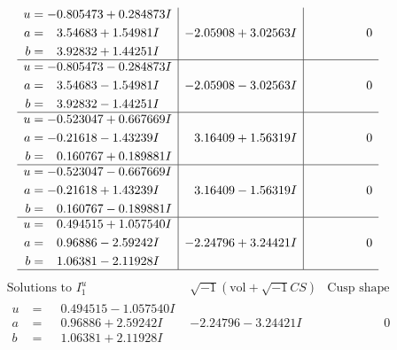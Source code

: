 \documentclass[1p]{elsarticle_modified}
\theoremstyle{definition}
\newcommand{\I}{\sqrt{-1}}
\begin{document}
$$\begin{array}{c|c|c}
\begin{aligned}
u &= -0.805473 + 0.284873 I \\
a &= \phantom{-}3.54683 + 1.54981 I \\
b &= \phantom{-}3.92832 + 1.44251 I\end{aligned}
 & -2.05908 + 3.02563 I & \phantom{-0.000000 } 0 \\ \hline\begin{aligned}
u &= -0.805473 - 0.284873 I \\
a &= \phantom{-}3.54683 - 1.54981 I \\
b &= \phantom{-}3.92832 - 1.44251 I\end{aligned}
 & -2.05908 - 3.02563 I & \phantom{-0.000000 } 0 \\ \hline\begin{aligned}
u &= -0.523047 + 0.667669 I \\
a &= -0.21618 - 1.43239 I \\
b &= \phantom{-}0.160767 + 0.189881 I\end{aligned}
 & \phantom{-}3.16409 + 1.56319 I & \phantom{-0.000000 } 0 \\ \hline\begin{aligned}
u &= -0.523047 - 0.667669 I \\
a &= -0.21618 + 1.43239 I \\
b &= \phantom{-}0.160767 - 0.189881 I\end{aligned}
 & \phantom{-}3.16409 - 1.56319 I & \phantom{-0.000000 } 0 \\ \hline\begin{aligned}
u &= \phantom{-}0.494515 + 1.057540 I \\
a &= \phantom{-}0.96886 - 2.59242 I \\
b &= \phantom{-}1.06381 - 2.11928 I\end{aligned}
 & -2.24796 + 3.24421 I & \phantom{-0.000000 } 0\\
 \hline 
 \end{array}$$\newpage$$\begin{array}{c|c|c}  
\text{Solutions to }I^u_{1}& \I (\text{vol} + \sqrt{-1}CS) & \text{Cusp shape}\\
 \hline 
\begin{aligned}
u &= \phantom{-}0.494515 - 1.057540 I \\
a &= \phantom{-}0.96886 + 2.59242 I \\
b &= \phantom{-}1.06381 + 2.11928 I\end{aligned}
 & -2.24796 - 3.24421 I & \phantom{-0.000000 } 0 \\ \hline\begin{aligned}

\end{aligned}
\end{array}$$
\end{document}
